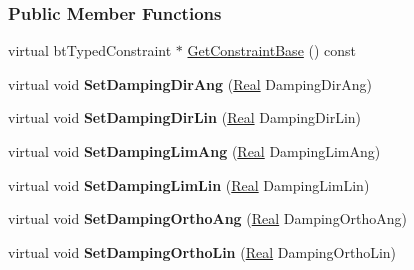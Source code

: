 \subsubsection*{Public Member Functions}
\begin{DoxyCompactItemize}
\item 
virtual btTypedConstraint $\ast$ \hyperlink{classMezzanine_1_1SliderConstraint_afb6bf65099b1d964975ee0853e81e38c}{GetConstraintBase} () const 
\item 
\hypertarget{classMezzanine_1_1SliderConstraint_a5fe8aad35e9c937ff0d7f6acb83f95c8}{
virtual void {\bfseries SetDampingDirAng} (\hyperlink{namespaceMezzanine_a726731b1a7df72bf3583e4a97282c6f6}{Real} DampingDirAng)}
\label{classMezzanine_1_1SliderConstraint_a5fe8aad35e9c937ff0d7f6acb83f95c8}

\item 
\hypertarget{classMezzanine_1_1SliderConstraint_a0dea8afcc78356cb67ff85b05222ae42}{
virtual void {\bfseries SetDampingDirLin} (\hyperlink{namespaceMezzanine_a726731b1a7df72bf3583e4a97282c6f6}{Real} DampingDirLin)}
\label{classMezzanine_1_1SliderConstraint_a0dea8afcc78356cb67ff85b05222ae42}

\item 
\hypertarget{classMezzanine_1_1SliderConstraint_abe0ba440ff8c0d03dc4a276149da5adb}{
virtual void {\bfseries SetDampingLimAng} (\hyperlink{namespaceMezzanine_a726731b1a7df72bf3583e4a97282c6f6}{Real} DampingLimAng)}
\label{classMezzanine_1_1SliderConstraint_abe0ba440ff8c0d03dc4a276149da5adb}

\item 
\hypertarget{classMezzanine_1_1SliderConstraint_aba8b7479622574f0098258ed09a53d8a}{
virtual void {\bfseries SetDampingLimLin} (\hyperlink{namespaceMezzanine_a726731b1a7df72bf3583e4a97282c6f6}{Real} DampingLimLin)}
\label{classMezzanine_1_1SliderConstraint_aba8b7479622574f0098258ed09a53d8a}

\item 
\hypertarget{classMezzanine_1_1SliderConstraint_ad399d4178335f6fa025d1ac892167157}{
virtual void {\bfseries SetDampingOrthoAng} (\hyperlink{namespaceMezzanine_a726731b1a7df72bf3583e4a97282c6f6}{Real} DampingOrthoAng)}
\label{classMezzanine_1_1SliderConstraint_ad399d4178335f6fa025d1ac892167157}

\item 
\hypertarget{classMezzanine_1_1SliderConstraint_a483e62ea124a05a982b9a56844141eae}{
virtual void {\bfseries SetDampingOrthoLin} (\hyperlink{namespaceMezzanine_a726731b1a7df72bf3583e4a97282c6f6}{Real} DampingOrthoLin)}
\label{classMezzanine_1_1SliderConstraint_a483e62ea124a05a982b9a56844141eae}


\end{DoxyCompactItemize}
